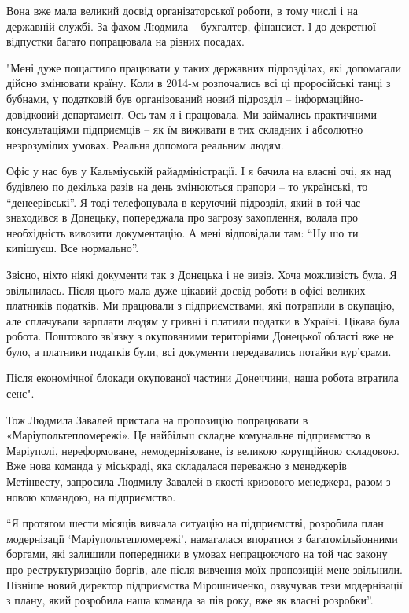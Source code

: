 Вона вже мала великий досвід організаторської роботи, в тому числі і на
державній службі. За фахом Людмила – бухгалтер, фінансист. І до декретної
відпустки багато попрацювала на різних посадах.

"Мені дуже пощастило працювати у таких державних підрозділах, які допомагали
дійсно змінювати країну. Коли в 2014-м розпочались всі ці проросійські танці з
бубнами, у податковій був організований новий підрозділ –
інформаційно-довідковий департамент. Ось там я і працювала. Ми займались
практичними консультаціями підприємців – як їм виживати в тих складних і
абсолютно незрозумілих умовах. Реальна допомога реальним людям.

Офіс у нас був у Кальміуській райадміністрації. І я бачила на власні очі, як
над будівлею по декілька разів на день змінюються прапори – то українські, то
\enquote{денеерівські}. Я тоді телефонувала в керуючий  підрозділ, який в той час
знаходився в Донецьку, попереджала про загрозу захоплення, волала про
необхідність вивозити документацію. А мені відповідали там: \enquote{Ну шо ти
кипішуєш. Все нормально}. 

Звісно, ніхто ніякі документи так з Донецька і не вивіз. Хоча можливість була.
Я звільнилась. Після цього мала дуже цікавий досвід роботи в офісі великих
платників податків. Ми працювали з підприємствами, які потрапили в окупацію,
але сплачували зарплати людям у гривні і платили податки в Україні. Цікава була
робота. Поштового зв'язку з окупованими територіями Донецької області вже не
було, а платники податків були, всі документи передавались потайки кур'єрами. 

Після економічної блокади окупованої частини Донеччини, наша робота втратила
сенс".

Тож Людмила Завалей пристала на пропозицію попрацювати в
«Маріупольтепломережі». Це найбільш складне комунальне підприємство в
Маріуполі, нереформоване, немодернізоване, із великою корупційною складовою.
Вже нова команда у міськраді, яка складалася переважно з менеджерів Метінвесту,
запросила Людмилу Завалей в якості кризового менеджера, разом з новою командою,
на підприємство.

\enquote{Я протягом шести місяців вивчала ситуацію на підприємстві,  розробила план
модернізації \enquote{Маріупольтепломережі}, намагалася впоратися з багатомільйонними
боргами, які залишили попередники в умовах непрацюючого на той час закону про
реструктуризацію боргів, але після вивчення моїх пропозицій мене звільнили.
Пізніше новий директор підприємства Мірошниченко, озвучував тези модернізації з
плану, який розробила наша команда за пів року, вже як власні розробки}. 


